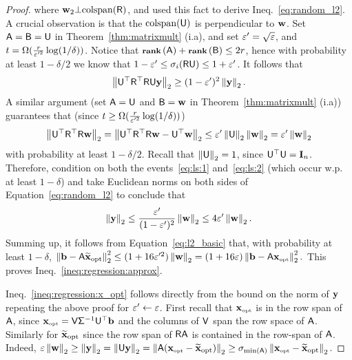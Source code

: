 \begin{proof}
where $\w_2\bot\text{colspan}(\matR)$, and used this fact to derive Ineq.~\eqref{eq:random_l2}. A crucial observation is that the  $\text{colspan}(\matU)$ is perpendicular to $\w$. Set $\matA=\matB=\matU$ in Theorem~\ref{thm:matrixmult} (i.a), and set $\eps' = \sqrt{\eps}$, and $t=\Omega( \frac{r}{\eps'^2}\log(1/\delta))$. Notice that $\rank{\matA}+\rank{\matB} \leq 2r$, hence with probability at least $1-\delta/2$ we know that $1-\eps' \leq \sigma_i(\matR\matU) \leq 1 + \eps'$. It follows that
\begin{equation}\label{eq:ls:1}
\norm{\matU^\top \matR^\top \matR \matU \y } \geq (1-\eps')^2 \norm{\y}.
\end{equation}
A similar argument (set $\matA=\matU$ and $\matB=\w$ in Theorem~\ref{thm:matrixmult} (i.a)) guarantees that (since $t\geq \Omega( \frac{r}{\eps'^2}\log(1/\delta))$)
\begin{equation}\label{eq:ls:2}
	\norm{\matU^\top \matR^\top \matR\w } = \norm{\matU^\top \matR^\top \matR\w - \matU^\top \w} \leq \eps' \norm{\matU} \norm{\w}= \eps' \norm{\w}
\end{equation}
with probability at least $1-\delta /2$. Recall that $\norm{\matU}  = 1$, since $\matU^\top \matU = \Id_n$. Therefore, condition on both the events~\eqref{eq:ls:1} and~\eqref{eq:ls:2} (which occur w.p. at least $1-\delta$) and take Euclidean norms on both sides of Equation~\eqref{eq:random_l2} to conclude that
\[ \norm{ \y} \leq \dfrac{\eps'}{(1-\eps')^2} \norm{\w} \leq 4\eps' \norm{\w}. \]
Summing up, it follows from Equation~\eqref{eq:l2_basic} that, with probability at least $1-\delta$, $\norm{\b-\matA\widetilde{\x}_{\text{opt}}}^2 \leq (1+16\eps'^2) \norm{\w} = (1 + 16\eps) \norm{\b-\matA\xopt}^2.$ This proves Ineq.~\eqref{ineq:regression:approx}.
%

%
Ineq.~\eqref{ineq:regression:x_opt} follows directly from the bound on the norm of $\y$ repeating the above proof for $\eps' \leftarrow \eps $. First recall that $\xopt$ is in the row span of $\matA$, since $\xopt = \matV\matSig^{-1} \matU^\top \b$ and the columns of $\matV$ span the row space of $\matA$. Similarly for $\widetilde{\x}_{\text{opt}}$ since the row span of $\matR \matA$ is contained in the row-span of $\matA$. Indeed, $\eps \norm{\w} \geq \norm{\y} =\norm{\matU\y} = \norm{\matA(\xopt - \widetilde{\x}_{\text{opt}}) } \geq \sigma_{\min(\matA)} \norm{ \xopt - \widetilde{\x}_{\text{opt}} }$.
\end{proof}
%
